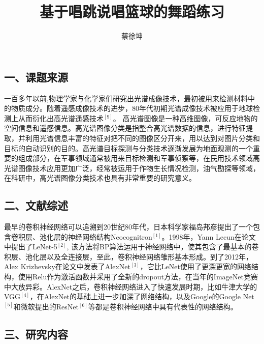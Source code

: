 \documentclass[UTF8,zihao=-4]{oucart}
\title{基于唱跳说唱篮球的舞蹈练习}
\author{蔡徐坤}
\begin{document}
    \makecoveror

    \newpage

    \setcounter{page}{1}

    \subsection*{一、课题来源}

    \begin{framed}

        一百多年以前,物理学家与化学家们研究出光谱成像技术，最初被用来检测材料中的物质成分。随着遥感成像技术的进步，80年代初期光谱成像技术被应用于地球检测上从而衍化出高光谱遥感技术$^{[9]}$。 高光谱图像是一种高维图像，可反应地物的空间信息和遥感信息。高光谱图像分类是指整合高光谱数据的信息，进行特征提取，并利用光谱信息丰富的特征对把不同的图像区分开来，用以达到对图片分类和目标的自动识别的目的。高光谱目标探测与分类技术逐渐发展为地面观测的一个重要的组成部分，在军事领域通常被用来目标检测和军事侦察等，在民用技术领域高光谱图像技术应用更加广泛，经常被运用于作物生长情况检测，油气勘探等领域，在科研中，高光谱图像分类技术也具有非常重要的研究意义。

    \end{framed}

    \subsection*{二、文献综述}

    \begin{framed}
        最早的卷积神经网络可以追溯到20世纪80年代，日本科学家福岛邦彦提出了一个包含卷积层、池化层的神经网络结构Neocognitron$^{[1]}$。1998年，Yann Lecun在论文中提出了LeNet-5$^{[2]}$, 该方法将BP算法运用于神经网络中，使其包含了最基本的卷积层、池化层以及全连接层，至此，卷积神经网络雏形基本形成。到了2012年，Alex Krizhevsky在论文中发表了AlexNet$^{[3]}$，它比LeNet使用了更深更宽的网络结构，使用Relu作为激活函数并采用了全新的dropout方法，在当年的ImageNet竞赛中大放异彩。AlexNet之后，卷积神经网络进入了快速发展时期，比如牛津大学的VGG$^{[4]}$，在AlexNet的基础上进一步加深了网络结构，以及Google的Google Net$^{[5]}$和微软提出的ResNet$^{[6]}$等都是卷积神经网络中具有代表性的网络结构。

        \printbibliography
        
    \end{framed}

    \subsection*{三、研究内容}
\end{document}
